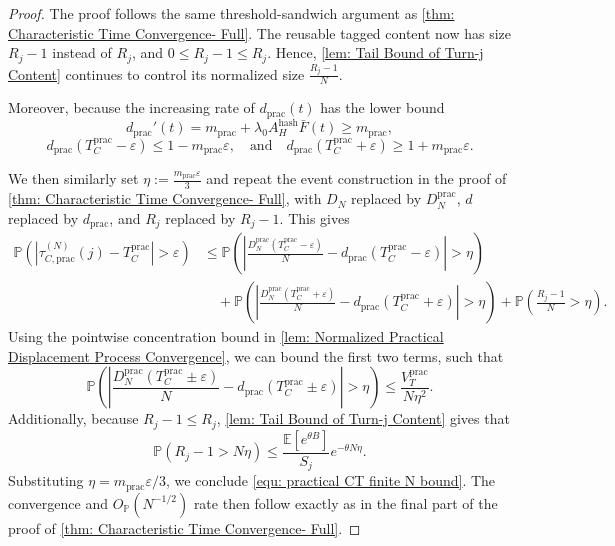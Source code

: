 \documentclass{article}
\theoremstyle{definition}
\newcommand{\E}{\mathbb E}
\newcommand{\pro}{\mathbb P}
\begin{document}
\begin{proof}
    The proof follows the same threshold-sandwich argument as \cref{thm: Characteristic Time Convergence- Full}. The reusable tagged content now has size $R_j-1$ instead of $R_j$, and $0\leq R_j-1 \leq R_j.$ Hence, \cref{lem: Tail Bound of Turn-j Content} continues to control its normalized size $\frac{R_j-1}{N}$.
    
    Moreover, because the increasing rate of $d_{\mathrm{prac}}(t)$ has the lower bound
    \begin{equation*}
        d_{\mathrm{prac}}'(t)=m_{\mathrm{prac}}+\lambda_0A_H^{\mathrm{hash}}\bar F(t)
    \geq m_{\mathrm{prac}},
    \end{equation*}
    \begin{equation*}
        d_{\mathrm{prac}}(T_C^{\mathrm{prac}}-\varepsilon)\leq1-m_{\mathrm{prac}}\varepsilon, \quad \text{and} \quad  d_{\mathrm{prac}}(T_C^{\mathrm{prac}}+\varepsilon)\geq1+m_{\mathrm{prac}}\varepsilon.
    \end{equation*}
    
    We then similarly set $\eta:=\frac{m_{\mathrm{prac}}\varepsilon}{3}$ and repeat the event construction in the proof of \cref{thm: Characteristic Time Convergence- Full}, with $D_N$ replaced by $D_N^{\mathrm{prac}}$, $d$ replaced by $d_{\mathrm{prac}}$, and $R_j$ replaced by $R_j-1$. This gives
    \begin{align*}
        \pro\left(\left|\tau_{C,\mathrm{prac}}^{(N)}(j)-T_C^{\mathrm{prac}}\right|>\varepsilon\right)
        &\leq\pro\left(\left|\frac{D_N^{\mathrm{prac}}(T_C^{\mathrm{prac}}-\varepsilon)}{N}-d_{\mathrm{prac}}(T_C^{\mathrm{prac}}-\varepsilon)\right|>\eta\right) \\
        &\quad+ \pro\left(\left|\frac{D_N^{\mathrm{prac}}(T_C^{\mathrm{prac}}+\varepsilon)}{N}-d_{\mathrm{prac}}(T_C^{\mathrm{prac}}+\varepsilon)\right|>\eta\right)+ \pro(\frac{R_j-1}{N}>\eta).
    \end{align*}
    Using the pointwise concentration bound in \cref{lem: Normalized Practical Displacement Process Convergence}, we can bound the first two terms, such that
    \begin{equation*}
        \pro\left(\left|\frac{D_N^{\mathrm{prac}}(T_C^{\mathrm{prac}}\pm\varepsilon)}{N}
        -d_{\mathrm{prac}}(T_C^{\mathrm{prac}}\pm\varepsilon)\right|>\eta\right)
        \leq\frac{V_T^{\mathrm{prac}}}{N\eta^2}.
    \end{equation*}
    Additionally, because $R_j-1\leq R_j$, \cref{lem: Tail Bound of Turn-j Content} gives that
    \begin{equation*}
        \pro(R_j-1>N\eta)
        \leq\frac{\E[e^{\theta B}]}{S_j}e^{-\theta N\eta}.
    \end{equation*}
    Substituting $\eta=m_{\mathrm{prac}}\varepsilon/3$, we conclude \eqref{equ: practical CT finite N bound}. The convergence and $O_{\mathbb P}(N^{-1/2})$ rate then follow exactly as in the final part of the proof of \cref{thm: Characteristic Time Convergence- Full}.
\end{proof}
\end{document}
